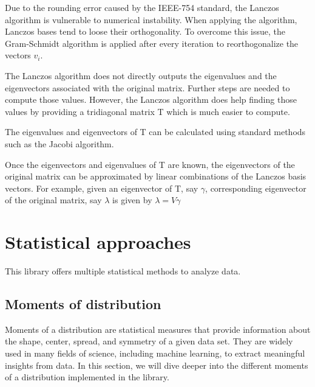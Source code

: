 \documentclass{book}
\begin{document}
Due to the rounding error caused by the IEEE-754 standard, the Lanczos algorithm is vulnerable to numerical instability. When applying the algorithm, Lanczos bases tend to loose their orthogonality. To overcome this issue, the Gram-Schmidt algorithm is applied after every iteration to reorthogonalize the vectors $v_{i}$.

The Lanczos algorithm does not directly outputs the eigenvalues and the eigenvectors associated with the original matrix. Further steps are needed to compute those values. However, the Lanczos algorithm does help finding those values by providing a tridiagonal matrix T which is much easier to compute. 

  The eigenvalues and eigenvectors of T can be calculated using standard methods such as the Jacobi algorithm. 

  Once the eigenvectors and eigenvalues of T are known, the eigenvectors of the original matrix can be approximated by linear combinations of the Lanczos basis vectors. For example, given an eigenvector of T, say $\gamma$, corresponding eigenvector of the original matrix, say $\lambda$ is given by $\lambda = V\gamma$ 
  
\section{Statistical approaches}

This library offers multiple statistical methods to analyze data.

\subsection{Moments of distribution}

Moments of a distribution are statistical measures that provide information about the shape, center, spread, and symmetry of a given data set. They are widely used in many fields of science, including machine learning, to extract meaningful insights from data. In this section, we will dive deeper into the different moments of a distribution implemented in the library. \\
\end{document}
